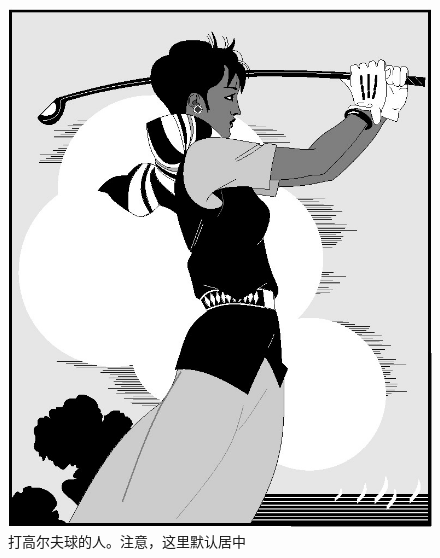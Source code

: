 \begin{figure}[htbp]
\begin{minipage}{0.4\textwidth}
    \includegraphics[width=\textwidth]{golfer}
    \caption{打高尔夫球的人。注意，这里默认居中}
    \label{golfer3}
  \end{minipage}
\end{figure}

